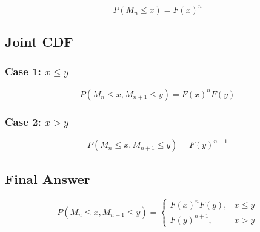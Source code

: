 \documentclass[12pt]{article}
\begin{document}
\[
P(M_n\le x)=F(x)^n
\]

\subsection*{Joint CDF}

\subsubsection*{Case 1: $x \le y$}

\[
P(M_n\le x, M_{n+1}\le y)
=
F(x)^n F(y)
\]

\subsubsection*{Case 2: $x>y$}

\[
P(M_n\le x, M_{n+1}\le y)
=
F(y)^{n+1}
\]

\subsection*{Final Answer}

\[
P(M_n\le x, M_{n+1}\le y)
=
\begin{cases}
F(x)^n F(y), & x\le y \\
F(y)^{n+1}, & x>y
\end{cases}
\]
\end{document}
